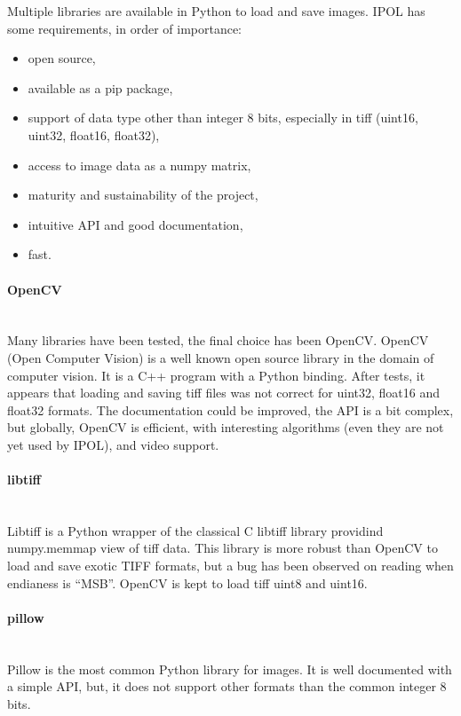 Multiple libraries are available in Python to load and save images. IPOL has some requirements, in order of importance:

\begin{itemize}
\item open source,
\item available as a pip package,
\item support of data type other than integer 8 bits, especially in tiff (uint16, uint32, float16, float32),
\item access to image data as a numpy matrix,
\item maturity and sustainability of the project,
\item intuitive API and good documentation,
\item fast.
\end{itemize}

\paragraph{OpenCV} \hspace{0pt} \\
Many libraries have been tested, the final choice has been OpenCV. OpenCV (Open Computer Vision) is a well known open source library in the domain of computer vision. It is a C++ program with a Python binding. After tests, it appears that loading and saving tiff files was not correct for uint32, float16 and float32 formats. The documentation could be improved, the API is a bit complex, but globally, OpenCV is efficient, with interesting algorithms (even they are not yet used by IPOL), and video support.

\paragraph{libtiff} \hspace{0pt} \\
Libtiff is a Python wrapper of the classical C libtiff library providind numpy.memmap view of tiff data. This library is more robust than OpenCV to load and save exotic TIFF formats, but a bug has been observed on reading when endianess is ``MSB''. OpenCV is kept to load tiff uint8 and uint16.

\paragraph{pillow} \hspace{0pt} \\
Pillow is the most common Python library for images. It is well documented with a simple API, but, it does not support other formats than the common integer 8 bits.

